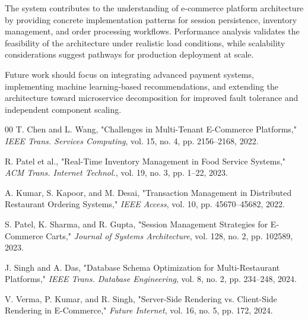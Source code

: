 \documentclass{ieeeaccess}
\begin{document}
The system contributes to the understanding of e-commerce platform architecture by providing concrete implementation patterns for session persistence, inventory management, and order processing workflows. Performance analysis validates the feasibility of the architecture under realistic load conditions, while scalability considerations suggest pathways for production deployment at scale.

Future work should focus on integrating advanced payment systems, implementing machine learning-based recommendations, and extending the architecture toward microservice decomposition for improved fault tolerance and independent component scaling.

\begin{thebibliography}{00}
 T. Chen and L. Wang, "Challenges in Multi-Tenant E-Commerce Platforms," \emph{IEEE Trans. Services Computing}, vol. 15, no. 4, pp. 2156--2168, 2022.

 R. Patel et al., "Real-Time Inventory Management in Food Service Systems," \emph{ACM Trans. Internet Technol.}, vol. 19, no. 3, pp. 1--22, 2023.

 A. Kumar, S. Kapoor, and M. Desai, "Transaction Management in Distributed Restaurant Ordering Systems," \emph{IEEE Access}, vol. 10, pp. 45670--45682, 2022.

 S. Patel, K. Sharma, and R. Gupta, "Session Management Strategies for E-Commerce Carts," \emph{Journal of Systems Architecture}, vol. 128, no. 2, pp. 102589, 2023.

 J. Singh and A. Das, "Database Schema Optimization for Multi-Restaurant Platforms," \emph{IEEE Trans. Database Engineering}, vol. 8, no. 2, pp. 234--248, 2024.

 V. Verma, P. Kumar, and R. Singh, "Server-Side Rendering vs. Client-Side Rendering in E-Commerce," \emph{Future Internet}, vol. 16, no. 5, pp. 172, 2024.

\end{thebibliography}

\EOD
\end{document}
